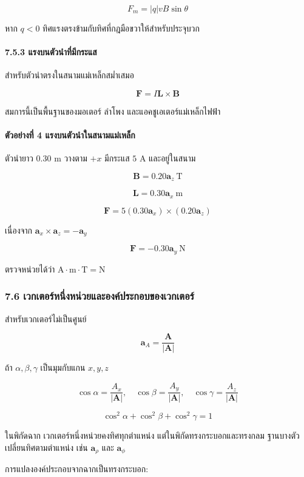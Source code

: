 \[
F_m=|q|vB\sin\theta
\]

หาก \(q<0\) ทิศแรงตรงข้ามกับทิศที่กฎมือขวาให้สำหรับประจุบวก

\paragraph{7.5.3 แรงบนตัวนำที่มีกระแส}

สำหรับตัวนำตรงในสนามแม่เหล็กสม่ำเสมอ

\[
\mathbf{F}=I\mathbf{L}\times\mathbf{B}
\]

สมการนี้เป็นพื้นฐานของมอเตอร์ ลำโพง และแอคชูเอเตอร์แม่เหล็กไฟฟ้า

\paragraph{ตัวอย่างที่ 4 แรงบนตัวนำในสนามแม่เหล็ก}

ตัวนำยาว \(0.30\) m วางตาม \(+x\) มีกระแส \(5\) A และอยู่ในสนาม

\[
\mathbf{B}=0.20\mathbf{a}_z\ \text{T}
\]

\[
\mathbf{L}=0.30\mathbf{a}_x\ \text{m}
\]

\[
\mathbf{F}=5(0.30\mathbf{a}_x)\times(0.20\mathbf{a}_z)
\]

เนื่องจาก \(\mathbf{a}_x\times\mathbf{a}_z=-\mathbf{a}_y\)

\[
\boxed{\mathbf{F}=-0.30\mathbf{a}_y\ \text{N}}
\]

ตรวจหน่วยได้ว่า \(\text{A}\cdot\text{m}\cdot\text{T}=\text{N}\)

\subsubsection{7.6 เวกเตอร์หนึ่งหน่วยและองค์ประกอบของเวกเตอร์}

สำหรับเวกเตอร์ไม่เป็นศูนย์

\[
\mathbf{a}_A=\frac{\mathbf{A}}{|\mathbf{A}|}
\]

ถ้า \(\alpha,\beta,\gamma\) เป็นมุมกับแกน \(x,y,z\)

\[
\cos\alpha=\frac{A_x}{|\mathbf{A}|},\quad
\cos\beta=\frac{A_y}{|\mathbf{A}|},\quad
\cos\gamma=\frac{A_z}{|\mathbf{A}|}
\]

\[
\cos^2\alpha+\cos^2\beta+\cos^2\gamma=1
\]

ในพิกัดฉาก เวกเตอร์หนึ่งหน่วยคงทิศทุกตำแหน่ง แต่ในพิกัดทรงกระบอกและทรงกลม ฐานบางตัวเปลี่ยนทิศตามตำแหน่ง เช่น \(\mathbf{a}_\rho\) และ \(\mathbf{a}_\phi\)

การแปลงองค์ประกอบจากฉากเป็นทรงกระบอก:

